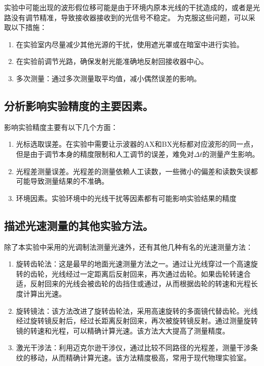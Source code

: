 \documentclass[]{../template/Report}%
\begin{document}
实验中可能出现的波形假位移可能是由于环境内原本光线的干扰造成的，或者是光路没有调节精准，导致接收器接收到的光信号不稳定。
为克服这些问题，可以采取以下措施：

\begin{enumerate}
    \item 在实验室内尽量减少其他光源的干扰，使用遮光罩或在暗室中进行实验。

    \item 在实验前调节光路，确保发射光能准确地反射回接收器中心。

    \item 多次测量：通过多次测量取平均值，减小偶然误差的影响。
\end{enumerate}

\subsection{分析影响实验精度的主要因素。}

影响实验精度主要有以下几个方面：

\begin{enumerate}
    \item 光标选取误差。在实验中需要让示波器的AX和BX光标都对应波形的同一点，但是由于调节本身的精度限制和人工调节的误差，难免对$\Delta t$的测量产生影响。

    \item 光程差测量误差。光程差的测量依赖人工读数，一些微小的偏差和读数失误都可能导致测量结果的不准确。

    \item 环境因素。实验环境中的光线干扰等因素都有可能影响实验结果的精度
\end{enumerate}

\subsection{描述光速测量的其他实验方法。}

除了本实验中采用的光调制法测量光速外，还有其他几种有名的光速测量方法：

\begin{enumerate}
    \item 旋转齿轮法：这是最早的地面光速测量方法之一。通过让光线穿过一个高速旋转的齿轮，光线经过一定距离后反射回来，再次通过齿轮。如果齿轮转速合适，反射回来的光线会被齿轮的齿挡住或通过，从而根据齿轮的转速和光程长度计算出光速。

    \item 旋转镜法：该方法改进了旋转齿轮法，采用高速旋转的多面镜代替齿轮。光线经过旋转镜反射后，经过长距离反射回来，再次被旋转镜反射。通过测量旋转镜的转速和光程，可以精确计算光速。该方法大大提高了测量精度。

    \item 激光干涉法：利用迈克尔逊干涉仪，通过比较不同路径的光程差，测量干涉条纹的移动，从而精确计算光速。该方法精度极高，常用于现代物理实验室。

\end{enumerate}

\insertnotes
\end{document}

